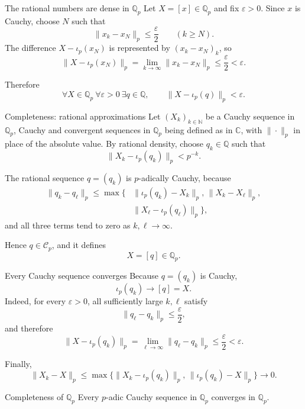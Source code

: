 \documentclass[aspectratio=169,11pt]{beamer}
\newcommand{\N}{\mathbb N}
\newcommand{\Q}{\mathbb Q}
\newcommand{\C}{\mathbb C}
\begin{document}
\begin{frame}{The rational numbers are dense in \(\Q_p\)}
  Let \(X=[x]\in\Q_p\) and fix \(\varepsilon>0\).  Since \(x\) is Cauchy,
  choose \(N\) such that
  \[
    \|x_k-x_N\|_p\le\frac{\varepsilon}{2}
    \qquad(k\ge N).
  \]
  The difference \(X-\iota_p(x_N)\) is represented by
  \((x_k-x_N)_k\), so
  \[
    \|X-\iota_p(x_N)\|_p
      =\lim_{k\to\infty}\|x_k-x_N\|_p
      \le\frac{\varepsilon}{2}<\varepsilon.
  \]

  Therefore
  \[
    \boxed{\forall X\in\Q_p\ \forall\varepsilon>0\
      \exists q\in\Q,\qquad
      \|X-\iota_p(q)\|_p<\varepsilon.}
  \]
\end{frame}

\begin{frame}{Completeness: rational approximations}
  Let \((X_k)_{k\in\N}\) be a Cauchy sequence in \(\Q_p\), Cauchy and
  convergent sequences in \(\Q_p\) being defined as in \(\C\), with
  \(\|\cdot\|_p\) in place of the absolute value.  By rational density,
  choose \(q_k\in\Q\) such that
  \[
    \|X_k-\iota_p(q_k)\|_p<p^{-k}.
  \]

  The rational sequence \(q=(q_k)\) is \(p\)-adically Cauchy, because
  \begin{align*}
    \|q_k-q_\ell\|_p
      \le\max\bigl\{
        &\|\iota_p(q_k)-X_k\|_p,\,
        \|X_k-X_\ell\|_p,\\
        &\|X_\ell-\iota_p(q_\ell)\|_p
        \bigr\},
  \end{align*}
  and all three terms tend to zero as \(k,\ell\to\infty\).

  Hence \(q\in\mathcal C_p\), and it defines
  \[
    X=[q]\in\Q_p.
  \]
\end{frame}

\begin{frame}{Every Cauchy sequence converges}
  Because \(q=(q_k)\) is Cauchy,
  \[
    \iota_p(q_k)\longrightarrow[q]=X.
  \]
  Indeed, for every \(\varepsilon>0\), all sufficiently large \(k,\ell\)
  satisfy
  \[
    \|q_\ell-q_k\|_p\le\frac{\varepsilon}{2},
  \]
  and therefore
  \[
    \|X-\iota_p(q_k)\|_p
      =\lim_{\ell\to\infty}\|q_\ell-q_k\|_p
      \le\frac{\varepsilon}{2}<\varepsilon.
  \]

  Finally,
  \[
    \|X_k-X\|_p
      \le\max\bigl\{
        \|X_k-\iota_p(q_k)\|_p,\,
        \|\iota_p(q_k)-X\|_p
        \bigr\}\longrightarrow0.
  \]

  \begin{alertblock}{Completeness of \(\Q_p\)}
    Every \(p\)-adic Cauchy sequence in \(\Q_p\) converges in \(\Q_p\).
  \end{alertblock}
\end{frame}
\end{document}
